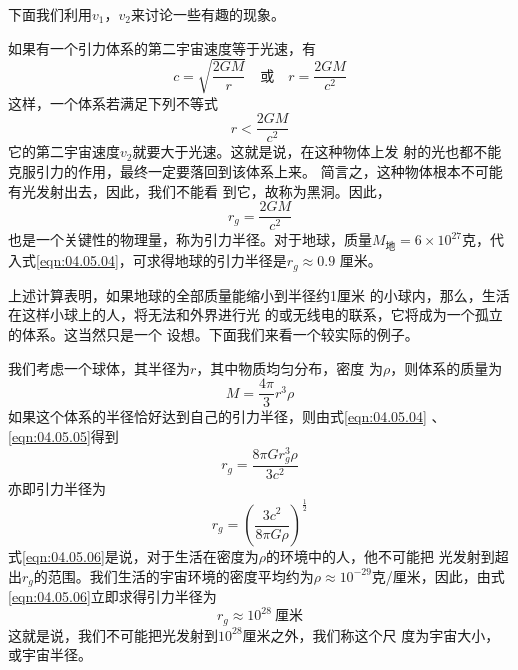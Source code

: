下面我们利用$  v _ 1 $，$ v _ 2 $来讨论一些有趣的现象。

如果有一个引力体系的第二宇宙速度等于光速，有
\begin{equation*}
c = \sqrt { \frac { 2 G M } { r } } \quad  
\text{或} \quad
r = \frac { 2 G M } { c ^ { 2 } }  
\end{equation*}
这样，一个体系若满足下列不等式
\begin{equation*}
	r < \frac { 2 G M } { c ^ { 2 } }  
\end{equation*}
它的第二宇宙速度$ v_2 $就要大于光速。这就是说，在这种物体上发
射的光也都不能克服引力的作用，最终一定要落回到该体系上来。
简言之，这种物体根本不可能有光发射出去，因此，我们不能看
到它，故称为黑洞。因此，
\begin{equation}\label{eqn:04.05.04}
	r _ { g } = \frac { 2 G M } { c ^ { 2 } } 
\end{equation}
也是一个关键性的物理量，称为引力半径。对于地球，质量$ M _ { \text{地} }= 6 \times 1 0 ^ { 2 7 }  $克，代入式\eqref{eqn:04.05.04}，可求得地球的引力半径是$  r _ { g } \approx 0 . 9  $
厘米。

上述计算表明，如果地球的全部质量能缩小到半径约1厘米
的小球内，那么，生活在这样小球上的人，将无法和外界进行光
的或无线电的联系，它将成为一个孤立的体系。这当然只是一个
设想。下面我们来看一个较实际的例子。

我们考虑一个球体，其半径为$ r $，其中物质均匀分布，密度
为$ \rho $，则体系的质量为
\begin{equation}\label{eqn:04.05.05}
	M = \frac { 4 \pi } { 3 } r ^ { 3 } \rho
\end{equation}
如果这个体系的半径恰好达到自己的引力半径，则由式\eqref{eqn:04.05.04} 、\eqref{eqn:04.05.05}得到
\begin{equation*}
	r _ { g } = \frac { 8 \pi G r _ { g } ^ { 3 } \rho } { 3 c ^ { 2 } }  
\end{equation*}
亦即引力半径为
\begin{equation}\label{eqn:04.05.06}
	r _ { g } = \left( \frac { 3 c ^ { 2 } } { 8 \pi G \rho } \right) ^ { \frac { 1 } { 2 } }  
\end{equation}
式\eqref{eqn:04.05.06}是说，对于生活在密度为$ \rho $的环境中的人，他不可能把
光发射到超出$ r_g $的范围。我们生活的宇宙环境的密度平均约为$ \rho
\approx 10 ^ {-29}$克/厘米，因此，由式\eqref{eqn:04.05.06}立即求得引力半径为
\begin{equation*}
r _ g \approx 10 ^ {28} ~\text{厘米}
\end{equation*}
这就是说，我们不可能把光发射到$ 10 ^ {28} $厘米之外，我们称这个尺
度为宇宙大小，或宇宙半径。